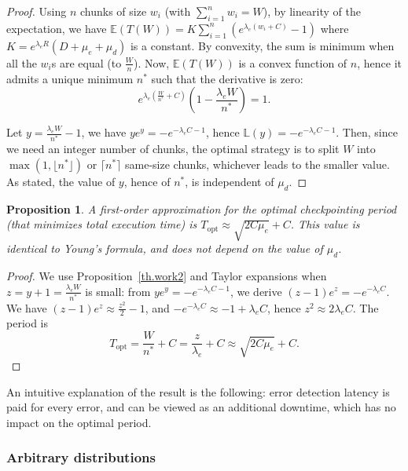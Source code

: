 \documentclass[10pt,table]{article}
\newtheorem{proposition}{Proposition}
\newcommand{\ema}[1]{\ensuremath{#1}\xspace}
\newcommand{\E}{\mathbb{E}}
\newcommand{\www}{\ema{w}}
\newcommand{\WWW}{\ema{W}}
\newcommand{\lambdae}{\ema{\lambda_{e}}}
\newcommand{\mue}{\ema{\mu_{e}}}
\newcommand{\mud}{\ema{\mu_{d}}}
\newcommand{\ccc}{\ema{C}}
\newcommand{\rrr}{\ema{R}}
\newcommand{\ddd}{\ema{D}}
\newcommand{\lamb}{\mathbb{L}} \newcommand{\T}{\ensuremath{T}\xspace}
\newcommand{\Topt}{\ema{T_{\text{opt}}}}
\begin{document}
\begin{proof}
Using $n$ chunks of size $\www_{i}$ (with $\sum_{i=1}^{n} \www_{i} = \WWW$), by linearity of the expectation, we have $\E(\T(\WWW))= K \sum_{i=1}^{n}(e^{\lambdae(\www_{i} + \ccc)} -1 )$
where $K = e^{\lambdae \rrr} \left(\ddd + \mue + \mud \right) $ is a constant. By convexity, the sum is minimum when all the
$\www_{i}$s are equal (to $\frac{\WWW}{n}$). Now, $\E(\T(\WWW))$ is a convex function of $n$, hence it admits a unique minimum $n^{*}$ such that the derivative is zero:
\begin{equation}
e^{\lambdae(\frac{\WWW}{n^{*}} + \ccc)} (1 -\frac{\lambdae \WWW}{n^{*}}) = 1.
\label{eq.dq4}
\end{equation}

Let $y=\frac{\lambdae \WWW}{n^{*}}-1$, we have $y e^{y} = -e^{-\lambdae \ccc -1}$, hence
$\lamb(y) = -e^{-\lambdae \ccc -1}$.
Then, since we need an integer number of chunks, the optimal strategy  is
to split $\WWW$ into $\max(1,\lfloor n^{*} \rfloor)$ or
$\lceil n^{*} \rceil$ same-size chunks, whichever leads to the smaller value.
As stated, the value of $y$, hence of $n^{*}$, is independent of $\mud$.
\end{proof}

\begin{proposition}
\label{th.work3}
A first-order approximation for the optimal checkpointing period (that minimizes total execution time) is 
$\Topt \approx \sqrt{2 \ccc \mue}+\ccc$.
This value  is identical to Young's formula, and does not depend on the value of \mud.
\end{proposition}

\begin{proof}
We use  Proposition~\ref{th.work2} and Taylor expansions 
when $z = y+1 = \frac{\lambdae \WWW}{n^{*}}$ is small: from $y e^{y} = -e^{-\lambdae \ccc -1}$,
we derive $(z-1) e^{z} = -e^{-\lambdae \ccc}$. We have  $(z-1) e^{z}\approx \frac{z^{2}}{2}-1$,
and $ -e^{-\lambdae \ccc} \approx -1 + \lambdae \ccc$, hence $z^{2} \approx 2 \lambdae \ccc$. The period
is 
$$\Topt = \frac{\WWW}{n^{*}} + \ccc = \frac{z}{\lambdae} +\ccc
 \approx  \sqrt{2 \ccc \mue}+\ccc.$$
\end{proof}

An intuitive explanation of the result is the following: error
detection latency is paid for every error,
and can be viewed as an additional downtime, which has no impact on the optimal period.

\subsubsection{Arbitrary distributions}
\label{sec.sub.arbi}
\end{document}
